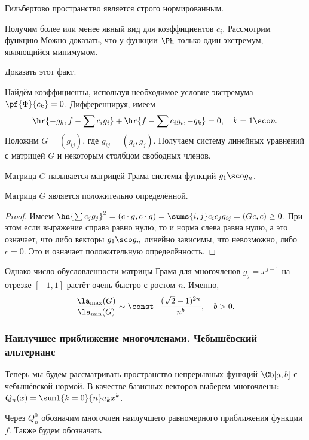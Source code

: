 \documentclass[a4paper]{article}
\begin{document}
\begin{problem}
Гильбертово пространство является строго нормированным.
\end{problem}

Получим более или менее явный вид для коэффициентов $c_i$.
Рассмотрим функцию
Можно доказать, что у функции $\Ph$ только один экстремум, являющийся минимумом.
\begin{problem}
Доказать этот факт.
\end{problem}
Найдём коэффициенты, используя необходимое условие экстремума $\pf{\Phi}{c_k} = 0$.
Дифференцируя, имеем
$$\hr{-g_k, f- \sum c_i g_i} + \hr{f - \sum c_i g_i, -g_k} = 0, \quad k = 1\sco n.$$
Положим $G = (g_{ij})$, где $g_{ij} = (g_i, g_j)$.
Получаем систему линейных уравнений с матрицей $G$ и некоторым столбцом свободных членов.

Матрица $G$ называется матрицей Грама системы функций $g_1\sco g_n$.
\begin{stm}
Матрица $G$ является положительно определённой.
\end{stm}
\begin{proof}
Имеем
$\hn{\sum c_j g_j}^2 = (c \cdot g, c \cdot g) = \sums{i,j} c_i c_j g_{ij} = (Gc, c) \ge 0$.
При этом если выражение справа равно нулю, то и норма слева равна нулю, а это означает,
что либо векторы $g_1\sco g_n$ линейно зависимы, что невозможно, либо $c = 0$. Это и означает
положительную определённость.
\end{proof}

Однако число обусловленности матрицы Грама для многочленов $g_j = x^{j-1}$ на отрезке
$[-1,1]$ растёт очень быстро с ростом $n$. Именно,
$$\frac{\la_{\max}(G)}{\la_{\min}(G)} \sim \const \cdot\frac{(\sqrt2 + 1)^{2n}}{n^b}, \quad b > 0.$$

\subsubsection{Наилучшее приближение многочленами. Чебышёвский альтернанс}

Теперь мы будем рассматривать пространство непрерывных функций $\Cb[a,b]$ с чебышёвской нормой.
В качестве базисных векторов выберем многочлены:
$Q_n(x) = \suml{k=0}{n} a_k x^k$.

Через $Q_n^0$ обозначим многочлен наилучшего равномерного приближения функции $f$.
Также будем обозначать
\end{document}
